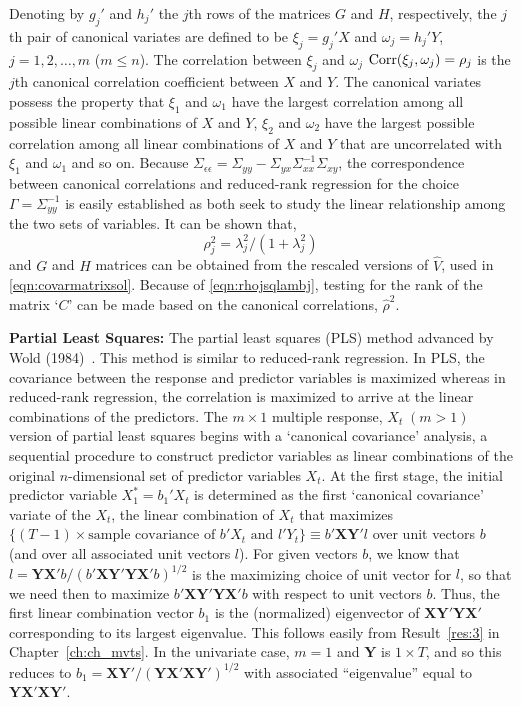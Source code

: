Denoting by $g_j'$ and $h_j'$ the $j$th rows of the matrices $G$ and $H$, respectively, the $j$th pair of canonical variates are defined to be $\xi_j= g_j' X$ and $\omega_j= h_j' Y$, $j= 1, 2, \ldots, m$ ($m \leq n$). The correlation between $\xi_j$ and $\omega_j$ $\operatorname{Corr}(\xi_j, \omega_j)= \rho_j$ is the $j$th canonical correlation coefficient between $X$ and $Y$. The canonical variates possess the property that $\xi_1$ and $\omega_1$ have the largest correlation among all possible linear combinations of $X$ and $Y$, $\xi_2$ and $\omega_2$ have the largest possible correlation among all linear combinations of $X$ and $Y$ that are uncorrelated with $\xi_1$ and $\omega_1$ and so on. Because $\Sigma_{\epsilon\epsilon}= \Sigma_{yy} - \Sigma_{yx} \Sigma_{xx}^{-1} \Sigma_{xy}$, the correspondence between canonical correlations and reduced-rank regression for the choice $\Gamma= \Sigma_{yy}^{-1}$ is easily established as both seek to study the linear relationship among the two sets of variables. It can be shown that,
	\begin{equation} \label{eqn:rhojsqlambj}
	\rho_j^2= \lambda_j^2 / (1+\lambda_j^2)
	\end{equation}
and $G$ and $H$ matrices can be obtained from the rescaled versions of $\hat{V}$, used in \eqref{eqn:covarmatrixsol}. Because of \eqref{eqn:rhojsqlambj}, testing for the rank of the matrix `$C$' can be made based on the canonical correlations, $\hat{\rho}^2$. \label{in:cancor2} \twomedskip


\noindent\textbf{Partial Least Squares:} The partial least squares (PLS) method advanced by Wold (1984)~\cite{wold}. This method is similar to reduced-rank regression. In PLS, the covariance between the response and predictor variables is maximized whereas in reduced-rank regression, the correlation is maximized to arrive at the linear combinations of the predictors. The $m \times 1$ multiple response, $X_t \;(m>1)$ version of partial least squares begins with a `canonical covariance' analysis, a sequential procedure to construct predictor variables as linear combinations of the original $n$-dimensional set of predictor variables $X_t$. At the first stage, the initial predictor variable $X_{1}^*=b_1'X_t$ is determined as the first `canonical covariance' variate of the $X_t$, the linear combination of $X_t$ that maximizes $\{(T - 1) \times \text{sample covariance of } b'X_t \text{ and } l'Y_t \} \equiv b' \mathbf{XY}' l$ over unit vectors $b$ (and over all associated unit vectors $l$). For given vectors $b$, we know that $l=\mathbf{YX'} b/(b' \mathbf{XY'YX'}b)^{1/2}$ is the maximizing choice of unit vector for $l$, so that we need then to maximize $b' \mathbf{XY'YX'}b$ with respect to unit vectors $b$. Thus, the first linear combination vector $b_1$ is the (normalized) eigenvector of $\mathbf{XY'YX'}$ corresponding to its largest eigenvalue. This follows easily from Result~\ref{res:3} in Chapter~\ref{ch:ch_mvts}. In the univariate case, $m=1$ and $\mathbf{Y}$ is $1 \times T$, and so this reduces to $b_1=\mathbf{XY'}/(\mathbf{YX'XY'})^{1/2}$ with associated ``eigenvalue'' equal to $\mathbf{YX'XY'}$.


